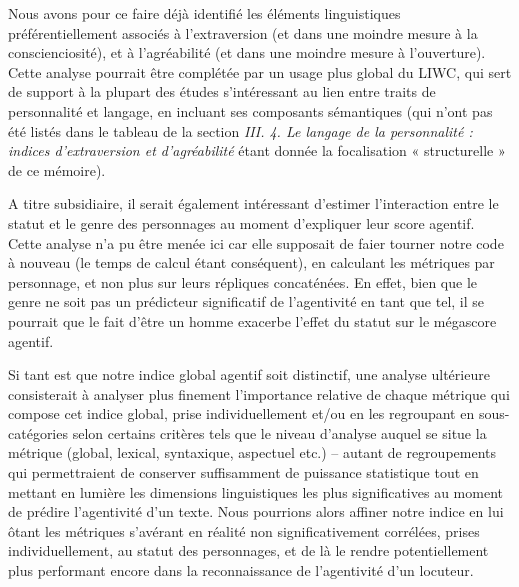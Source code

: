 Nous avons pour ce faire déjà identifié les éléments linguistiques préférentiellement associés à l’extraversion (et dans une moindre mesure à la conscienciosité), et à l’agréabilité (et dans une moindre mesure à l’ouverture). Cette analyse pourrait être complétée par un usage plus global du LIWC, qui sert de support à la plupart des études s’intéressant au lien entre traits de personnalité et langage, en incluant ses composants sémantiques (qui n’ont pas été listés dans le tableau de la section \textit{III. 4. Le langage de la personnalité : indices d’extraversion et d’agréabilité} étant donnée la focalisation  « structurelle » de ce mémoire).

A titre subsidiaire, il serait également intéressant d’estimer l'interaction entre le statut et le genre des personnages au moment d’expliquer leur score agentif. Cette analyse n’a pu être menée ici car elle supposait de faier tourner notre code à nouveau (le temps de calcul étant conséquent), en calculant les métriques par personnage, et non plus sur leurs répliques concaténées. En effet, bien que le genre ne soit pas un prédicteur significatif de l’agentivité en tant que tel, il se pourrait que le fait d’être un homme exacerbe l’effet du statut sur le mégascore agentif.

Si tant est que notre indice global agentif soit distinctif, une analyse ultérieure consisterait à analyser plus finement l'importance relative de chaque métrique qui compose cet indice global, prise individuellement et/ou en les regroupant en sous-catégories selon certains critères tels que le niveau d'analyse auquel se situe la métrique (global, lexical, syntaxique, aspectuel etc.) – autant de regroupements qui permettraient de conserver suffisamment de puissance statistique tout en mettant en lumière les dimensions linguistiques les plus significatives au moment de prédire l’agentivité d’un texte. Nous pourrions alors affiner notre indice en lui ôtant les métriques s’avérant en réalité non significativement corrélées, prises individuellement, au statut des personnages, et de là le rendre potentiellement plus performant encore dans la reconnaissance de l’agentivité d’un locuteur.

